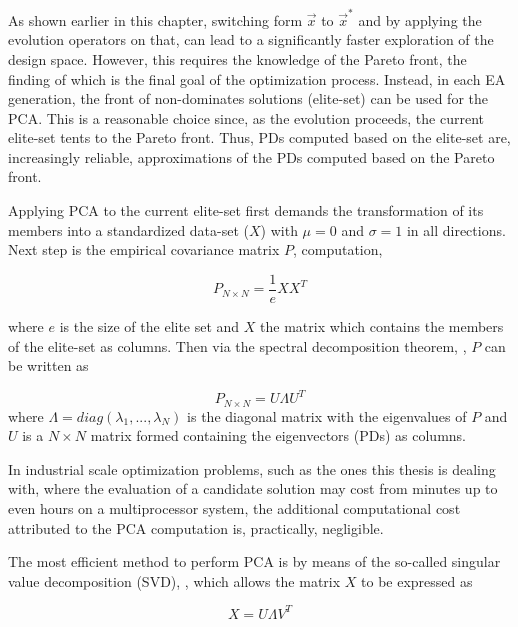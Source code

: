 As shown earlier in this chapter, switching form $\vec{x}$ to $\vec{x}^*$ and by applying the evolution operators on that, can lead to a significantly faster exploration of the design space. However, this requires the knowledge of the Pareto front, the finding of which is the final goal of the optimization process.  Instead, in each EA generation, the front of non-dominates solutions (elite-set) can be used for the PCA. This is a reasonable choice since, as the evolution proceeds, the current elite-set tents to the Pareto front. Thus, PDs computed based on the elite-set are, increasingly reliable, approximations of the PDs computed based on the Pareto front.

Applying PCA to the current elite-set first demands the transformation of  its members into a standardized data-set ($X$) with $\mu=0$ and $\sigma=1$ in all directions. Next step is the empirical covariance matrix $P$, \cite{Fodor_2002, Jolliffe_2002} computation,

\begin{equation} 
   P_{N\times N}= \frac{1}{e}XX^T
   \label{Cov_Mat} 
\end{equation}

where $e$ is the size of the elite set and $X$ the matrix which contains the members of the elite-set as columns. Then via the spectral decomposition theorem, \cite{Axler_1997, Fodor_2002}, $P$ can be written as

\begin{equation} 
   P_{N\times N}= U\Lambda U^T
   \label{spectral}
\end{equation}
where $\Lambda\!=\!diag(\lambda_1 , . . . , \lambda_N )$ is the diagonal matrix with the eigenvalues of $P$ and $U$ is a $N\!\times\!N$ matrix formed containing the eigenvectors (PDs) as columns. 


In industrial scale optimization problems, such as the ones this thesis is dealing with, where the evaluation of a candidate solution may cost from minutes up to even hours on a multiprocessor system, the additional computational cost attributed to the PCA computation is, practically, negligible.


The most efficient method to perform PCA is by means of the so-called singular value decomposition (SVD), \cite{press_etal:1992}, which allows the matrix $X$ to be expressed as

\begin{equation} 
   X = U\Lambda V^T
   \label{Cov_Mat2} 
\end{equation}

